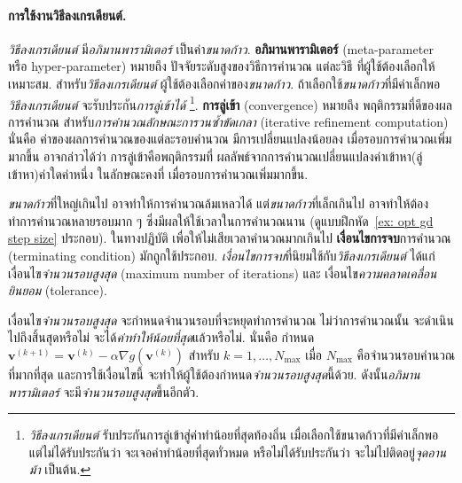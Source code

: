 \paragraph{การใช้งานวิธีลงเกรเดียนต์.}
\textit{วิธีลงเกรเดียนต์} มี\textit{อภิมานพารามิเตอร์}
เป็นค่า\textit{ขนาดก้าว}.
%
\textbf{อภิมานพารามิเตอร์}
(meta-parameter หรือ hyper-parameter)
หมายถึง ปัจจัยระดับสูงของวิธีการคำนวณ แต่ละวิธี
ที่ผู้ใช้ต้องเลือกให้เหมาะสม.
สำหรับ\textit{วิธีลงเกรเดียนต์}
ผู้ใช้ต้องเลือกค่าของ\textit{ขนาดก้าว}.
ถ้าเลือกใช้\textit{ขนาดก้าว}ที่มีค่าเล็กพอ
\textit{วิธีลงเกรเดียนต์}
จะรับประกัน\textit{การลู่เข้าได้}%
\footnote{%
\textit{วิธีลงเกรเดียนต์}
รับประกันการลู่เข้าสู่ค่าทำน้อยที่สุดท้องถิ่น
เมื่อเลือกใช้ขนาดก้าวที่มีค่าเล็กพอ
แต่ไม่ได้รับประกันว่า
จะเจอค่าทำน้อยที่สุดทั่วหมด
หรือไม่ได้รับประกันว่า จะไม่ไปติดอยู่\textit{จุดอานม้า} เป็นต้น.
}.
\textbf{การลู่เข้า} (convergence)
หมายถึง พฤติกรรมที่ดีของผลการคำนวณ
สำหรับ\textit{การคำนวณลักษณะการวนซ้ำขัดเกลา} (iterative refinement computation)
นั่นคือ
ค่าของผลการคำนวณของแต่ละรอบคำนวณ
มีการเปลี่ยนแปลงน้อยลง เมื่อรอบการคำนวณเพิ่มมากขึ้น
อาจกล่าวได้ว่า
การลู่เข้าคือพฤติกรรมที่ ผลลัพธ์จากการคำนวณเปลี่ยนแปลงค่าเข้าหา(ลู่เข้าหา)ค่าใดค่าหนึ่ง ในลักษณะคงที่
เมื่อรอบการคำนวณเพิ่มมากขึ้น.

\textit{ขนาดก้าว}ที่ใหญ่เกินไป อาจทำให้การคำนวณล้มเหลวได้
แต่\textit{ขนาดก้าว}ที่เล็กเกินไป อาจทำให้ต้องทำการคำนวณหลายรอบมาก ๆ 
ซึ่งมีผลให้ใช้เวลาในการคำนวณนาน
(ดูแบบฝึกหัด~\ref{ex: opt gd step size} ประกอบ).
ในทางปฏิบัติ
เพื่อให้ไม่เสียเวลาคำนวณมากเกินไป
\textbf{เงื่อนไขการจบ}การคำนวณ (terminating condition)
มักถูกใช้ประกอบ.
%
\textit{เงื่อนไขการจบ}ที่นิยมใช้กับ\textit{วิธีลงเกรเดียนต์}
ได้แก่ เงื่อนไข\textit{จำนวนรอบสูงสุด} (maximum number of iterations)
และ
เงื่อนไข\textit{ความคลาดเคลื่อนยินยอม} (tolerance).

เงื่อนไข\textit{จำนวนรอบสูงสุด}
จะกำหนดจำนวนรอบที่จะหยุดทำการคำนวณ
ไม่ว่าการคำนวณนั้น จะดำเนินไปถึงสิ้นสุดหรือไม่ จะได้\textit{ค่าทำให้น้อยที่สุด}แล้วหรือไม่.
นั่นคือ กำหนด
$\bm{v}^{(k+1)} = \bm{v}^{(k)} - \alpha \nabla g (\bm{v}^{(k)})$ สำหรับ $k = 1, \ldots, N_{\max}$
เมื่อ $N_{\max}$ คือจำนวนรอบคำนวณที่มากที่สุด
และการใช้เงื่อนไขนี้ จะทำให้ผู้ใช้ต้องกำหนด\textit{จำนวนรอบสูงสุด}นี้ด้วย.
ดังนั้น\textit{อภิมานพารามิเตอร์}
จะมี\textit{จำนวนรอบสูงสุด}ขึ้นอีกตัว.

